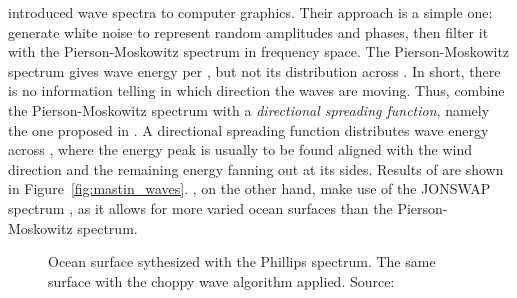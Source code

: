 \citet{Mastin:1987} introduced wave spectra to computer graphics. Their approach
is a simple one: generate white noise to represent random amplitudes and phases,
then filter it with the Pierson-Moskowitz spectrum
\citep{article:PiersonMoskowitz1964} in frequency space. The Pierson-Moskowitz
spectrum gives wave energy per \wavenumber, but not its distribution across
\wavevectors. In short, there is no information telling in which direction the
waves are moving. Thus, \citeauthor{Mastin:1987} combine the Pierson-Moskowitz
spectrum with a \emph{directional spreading function}, namely the one proposed
in \citet{article:Hasselmann1980}. A directional
spreading function distributes wave energy across \wavevectors, where
the energy peak is usually to be found aligned with the wind direction and the
remaining energy fanning out at its sides. Results of \citet{Mastin:1987} are
shown in Figure~\ref{fig:mastin_waves}.
\citet{Premoze:2000}, on the other hand, make use of the JONSWAP spectrum
\citep{article:Hasselman1973}, as it allows for more varied ocean surfaces than
the Pierson-Moskowitz spectrum.
%
\begin{figure}
 \centering
 \hfill
 \caption[Choppy waves by \citet{course:simulatingocean}.]{
 Ocean surface sythesized with the Phillips spectrum.
 The same surface with the choppy wave algorithm applied.
Source: \citet{course:simulatingocean}
}
\label{fig:tessendorf_choppy_waves}
\end{figure}
%

